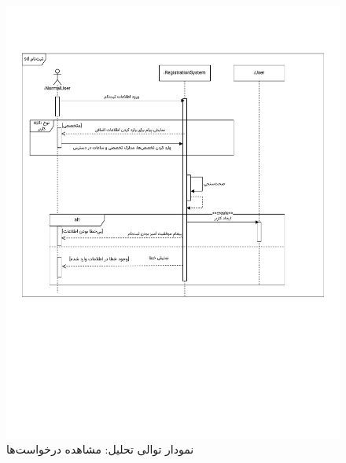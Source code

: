 \begin{figure}[ht!]
	\centering
	\includegraphics[scale=0.8, page=10]{figs/OOD-Sequence-1.pdf}
	\caption{نمودار توالی تحلیل: مشاهده درخواست‌ها}
\end{figure}
\FloatBarrier
\newpage

